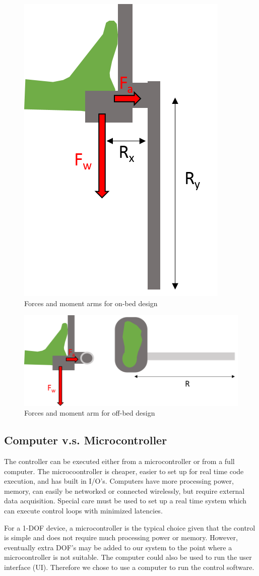 \documentclass[12pt]{report}
\begin{document}
	\begin{figure}[h] 
		\centering
		\includegraphics[width=0.3\linewidth]{on-bed_moment}
		\caption{Forces and moment arms for on-bed design}
		\label{fig:on-bed_moment}
	\end{figure}
	
	
	\begin{figure}[h] 
		\centering
		\includegraphics[width=0.6\linewidth]{off-bed_moment}
		\caption{Forces and moment arm for off-bed design}
		\label{fig:off-bed_moment}
	\end{figure}
	
	
	\subsection{Computer v.s. Microcontroller}
	
	The controller can be executed either from a microcontroller or from a full computer. The microcoontroller is cheaper, easier to set up for real time code execution, and has built in I/O's. Computers have more processing power, memory, can easily be networked or connected wirelessly, but require external data acquisition. Special care must be used to set up a real time system which can execute control loops with minimized latencies. 
	
	For a 1-DOF device, a microcontroller is the typical choice given that the control is simple and does not require much processing power or memory. However, eventually extra DOF's may be added to our system to the point where a microcontroller is not suitable. The computer could also be used to run the user interface (UI). Therefore we chose to use a computer to run the control software. 
\end{document}
